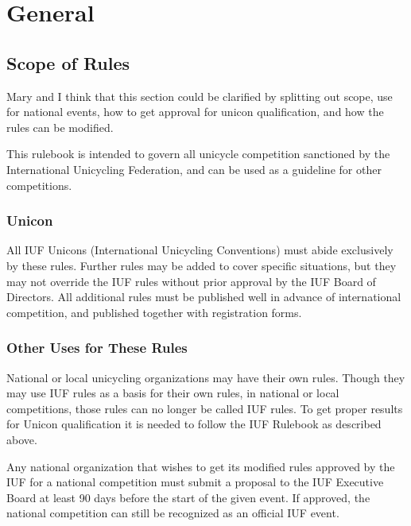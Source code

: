 \chapter{General}

\section{Scope of Rules}

\begin{comment2016}
Mary and I think that this section could be clarified by splitting out scope, use for national events, how to get approval for unicon qualification, and how the rules can be modified.
\end{comment2016}

This rulebook is intended to govern all unicycle competition sanctioned by the International Unicycling Federation, and can be used as a guideline for other competitions.

\subsection{Unicon \label{subsec:general_scope-of-rules_unicon}}

All IUF Unicons (International Unicycling Conventions) must abide exclusively by these rules.
Further rules may be added to cover specific situations, but they may not override the IUF rules without prior approval by the IUF Board of Directors.
All additional rules must be published well in advance of international competition, and published together with registration forms.

\subsection{Other Uses for These Rules}

National or local unicycling organizations may have their own rules.
Though they may use IUF rules as a basis for their own rules, in national or local competitions, those rules can no longer be called IUF rules.
To get proper results for Unicon qualification it is needed to follow the IUF Rulebook as described above.

Any national organization that wishes to get its modified rules approved by the IUF for a national competition must submit a proposal to the IUF Executive Board at least 90 days before the start of the given event.
If approved, the national competition can still be recognized as an official IUF event.

